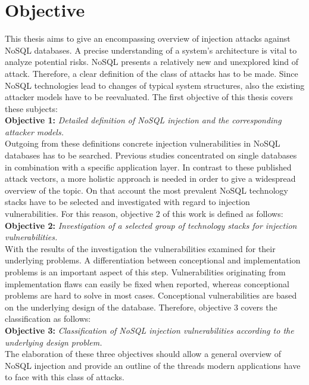 \section{Objective}
This thesis aims to give an encompassing overview of injection attacks against NoSQL databases. A precise understanding of a system's architecture is vital to analyze potential risks. NoSQL presents a relatively new and unexplored kind of attack. Therefore, a clear definition of the class of attacks has to be made. Since NoSQL technologies lead to changes of typical system structures, also the existing attacker models have to be reevaluated. The first objective of this thesis covers these subjects: \\

\textbf{Objective 1:} \textit{Detailed definition of NoSQL injection and the corresponding attacker models.} \\

Outgoing from these definitions concrete injection vulnerabilities in NoSQL databases has to be searched. Previous studies concentrated on single databases in combination with a specific application layer. In contrast to these published attack vectors, a more holistic approach is needed in order to give a widespread overview of the topic. On that account the most prevalent NoSQL technology stacks have to be selected and investigated with regard to injection vulnerabilities. For this reason, objective 2 of this work is defined as follows: \\

\textbf{Objective 2:} \textit{Investigation of a selected group of technology stacks for injection vulnerabilities.} \\

With the results of the investigation the vulnerabilities examined for their underlying problems. A differentiation between conceptional and implementation problems is an important aspect of this step. Vulnerabilities originating from implementation flaws can easily be fixed when reported, whereas conceptional problems are hard to solve in most cases. Conceptional vulnerabilities are based on the underlying design of the database. Therefore, objective 3 covers the classification as follows: \\

\textbf{Objective 3:} \textit{Classification of NoSQL injection vulnerabilities according to the underlying design problem.} \\

The elaboration of these three objectives should allow a general overview of NoSQL injection and provide an outline of the threads modern applications have to face with this class of attacks.


